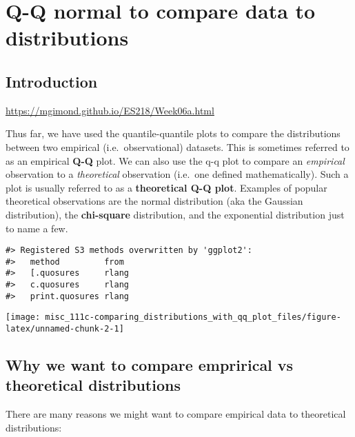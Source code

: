 \documentclass[]{book}
\begin{document}
\hypertarget{q-q-normal-to-compare-data-to-distributions}{%
\chapter{Q-Q normal to compare data to distributions}\label{q-q-normal-to-compare-data-to-distributions}}

\hypertarget{introduction}{%
\section{Introduction}\label{introduction}}

\url{https://mgimond.github.io/ES218/Week06a.html}

Thus far, we have used the quantile-quantile plots to compare the distributions between two empirical (i.e.~observational) datasets. This is sometimes referred to as an empirical \textbf{Q-Q} plot. We can also use the q-q plot to compare an \emph{empirical} observation to a \emph{theoretical} observation (i.e.~one defined mathematically). Such a plot is usually referred to as a \textbf{theoretical Q-Q plot}. Examples of popular theoretical observations are the normal distribution (aka the Gaussian distribution), the \textbf{chi-square} distribution, and the exponential distribution just to name a few.

\begin{verbatim}
#> Registered S3 methods overwritten by 'ggplot2':
#>   method         from 
#>   [.quosures     rlang
#>   c.quosures     rlang
#>   print.quosures rlang
\end{verbatim}

\begin{center}\texttt{[image: misc\_111c-comparing\_distributions\_with\_qq\_plot\_files/figure-latex/unnamed-chunk-2-1]} \end{center}

\hypertarget{why-we-want-to-compare-emprirical-vs-theoretical-distributions}{%
\section{Why we want to compare emprirical vs theoretical distributions}\label{why-we-want-to-compare-emprirical-vs-theoretical-distributions}}

There are many reasons we might want to compare empirical data to theoretical distributions:
\end{document}
